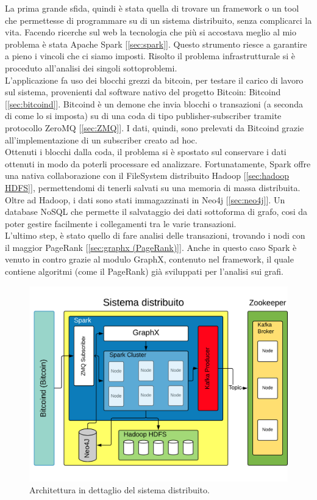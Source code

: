 La prima grande sfida, quindi è stata quella di trovare un framework o un tool che permettesse di programmare su di un sistema distribuito, senza complicarci la vita. Facendo ricerche sul web la tecnologia che più si accostava meglio al mio problema è stata Apache Spark [\ref{sec:spark}]. Questo strumento riesce a garantire a pieno i vincoli che ci siamo imposti. Risolto il problema infrastrutturale si è proceduto all'analisi dei singoli sottoproblemi. 
\\L'applicazione fa uso dei blocchi grezzi da bitcoin, per testare il carico di lavoro sul sistema, provenienti dal software nativo del progetto Bitcoin: Bitcoind [\ref{sec:bitcoind}]. Bitcoind è un demone che invia blocchi o transazioni (a seconda di come lo si imposta) su di una coda di tipo publisher-subscriber tramite protocollo ZeroMQ [\ref{sec:ZMQ}]. I dati, quindi, sono prelevati da Bitcoind grazie all'implementazione di un subscriber creato ad hoc.
\\Ottenuti i blocchi dalla coda, il problema si è spostato sul conservare i dati ottenuti in modo da poterli processare ed analizzare. Fortunatamente, Spark offre una nativa collaborazione con il FileSystem distribuito Hadoop [\ref{sec:hadoop HDFS}], permettendomi di tenerli salvati su una memoria di massa distribuita.
\\Oltre ad Hadoop, i dati sono stati immagazzinati in Neo4j [\ref{sec:neo4j}]. Un database NoSQL che permette il salvataggio dei dati sottoforma di grafo, cosi da poter gestire facilmente i collegamenti tra le varie transazioni.
\\L'ultimo step, è stato quello di fare analisi delle transazioni, trovando i nodi con il maggior PageRank [\ref{sec:graphx (PageRank)}]. Anche in questo caso Spark è venuto in contro grazie al modulo GraphX, contenuto nel framework, il quale contiene algoritmi (come il PageRank) già sviluppati per l'analisi sui grafi.
\begin{figure}[H]
	\centering
	\includegraphics[width=\textwidth]{images/sistemaDistribuito.png}
	\caption{Architettura in dettaglio del sistema distribuito.}
	\label{fig:distribuitedSystemArchitetture}
\end{figure}  
